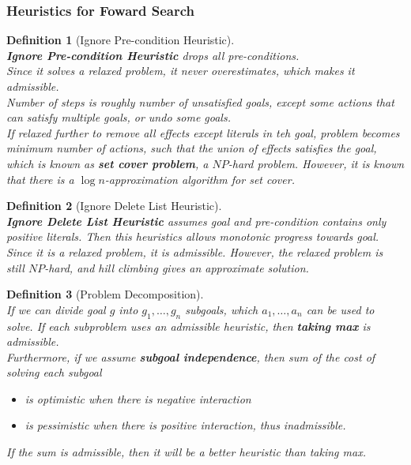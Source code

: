 \documentclass[12pt]{article}
\newtheorem{definition}{Definition}[section]
\theoremstyle{definition}
\begin{document}
\subsubsection{Heuristics for Foward Search}
\begin{definition}[Ignore Pre-condition Heuristic]
\hfill\\\normalfont \textbf{Ignore Pre-condition Heuristic} drops all pre-conditions.\\
Since it solves a relaxed problem, it never overestimates, which makes it admissible.\\
Number of steps is roughly number of unsatisfied goals, except some actions that can satisfy multiple goals, or undo some goals.\\

If relaxed further to remove all effects except literals in teh goal, problem becomes minimum number of actions, such that the union of effects satisfies the goal, which is known as \textbf{set cover problem}, a $NP$-hard problem. However, it is known that there is a $\log n$-approximation algorithm for set cover.
\end{definition}
\begin{definition}[Ignore Delete List Heuristic]
\hfill\\\normalfont \textbf{Ignore Delete List Heuristic} assumes goal and pre-condition contains only positive literals. Then this heuristics allows monotonic progress towards goal.\\
Since it is a relaxed problem, it is admissible. However, the relaxed problem is still $NP$-hard, and hill climbing gives an approximate solution.
\end{definition}
\begin{definition}[Problem Decomposition]
\hfill\\\normalfont If we can divide goal $g$ into $g_1,\ldots, g_n$ subgoals, which $a_1,\ldots, a_n$ can be used to solve. If each subproblem uses an admissible heuristic, then \textbf{taking max} is admissible.\\
Furthermore, if we assume \textbf{subgoal independence}, then sum of the cost of solving each subgoal
\begin{itemize}
	\item is optimistic when there is negative interaction
	\item is pessimistic when there is positive interaction, thus inadmissible.
\end{itemize}
If the sum is admissible, then it will be a better heuristic than taking max.
\end{definition}
\end{document}
